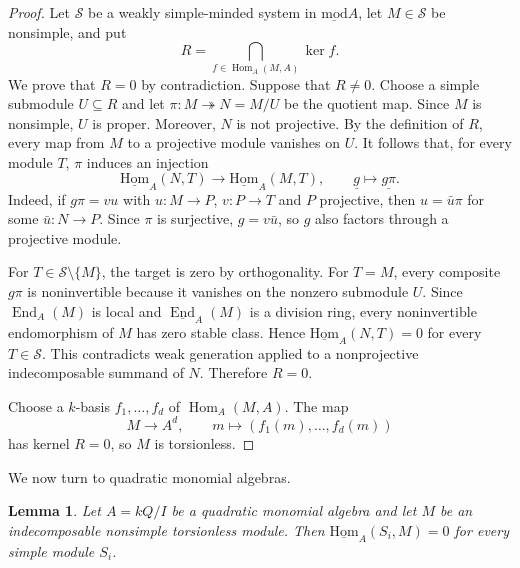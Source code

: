 \documentclass[11pt]{article}
\newcommand{\Hom}{\operatorname{Hom}}
\newcommand{\End}{\operatorname{End}}
\newcommand{\smod}{\operatorname{\underline{mod}}}
\newcommand{\sHom}{\operatorname{\underline{Hom}}}
\newtheorem{lemma}[theorem]{Lemma}
\theoremstyle{definition}
\begin{document}
		\begin{proof}
			Let $\mathcal S$ be a weakly simple-minded system in $\smod A$, let $M\in\mathcal S$ be nonsimple, and put
			\[
				R=\bigcap_{f\in\Hom_A(M,A)}\ker f.
			\]
			We prove that $R=0$ by contradiction. Suppose that $R\ne0$. Choose a simple submodule $U\subseteq R$ and let $\pi:M\twoheadrightarrow N=M/U$ be the quotient map. Since $M$ is nonsimple, $U$ is proper. Moreover, $N$ is not projective.
			By the definition of $R$, every map from $M$ to a projective module vanishes on $U$. It follows that, for every module $T$, $\pi$ induces an injection
			\[
				\sHom_A(N,T)\longrightarrow\sHom_A(M,T),
				\qquad \underline g\longmapsto\underline{g\pi}.
			\]
			Indeed, if $g\pi=vu$ with $u:M\to P$, $v:P\to T$ and $P$ projective, then $u=\bar u\pi$ for some $\bar u:N\to P$. Since $\pi$ is surjective, $g=v\bar u$, so $g$ also factors through a projective module.

			For $T\in\mathcal S\setminus\{M\}$, the target is zero by orthogonality. For $T=M$, every composite $g\pi$ is noninvertible because it vanishes on the nonzero submodule $U$. Since $\End_A(M)$ is local and $\underline{\End}_A(M)$ is a division ring, every noninvertible endomorphism of $M$ has zero stable class.
			Hence $\sHom_A(N,T)=0$ for every $T\in\mathcal S$. This contradicts weak generation applied to a nonprojective indecomposable summand of $N$. Therefore $R=0$.

			Choose a $k$-basis $f_1,\ldots,f_d$ of $\Hom_A(M,A)$. The map
			\[
				M\longrightarrow A^d,\qquad
				m\longmapsto(f_1(m),\ldots,f_d(m))
			\]
			has kernel $R=0$, so $M$ is torsionless.
		\end{proof}

		We now turn to quadratic monomial algebras.

		\begin{lemma}\label{lemma of torsionless simple maps}
			Let $A=kQ/I$ be a quadratic monomial algebra and let $M$ be an indecomposable nonsimple torsionless module. Then $\sHom_A(S_i,M)=0$ for every simple module $S_i$.
		\end{lemma}
\end{document}
